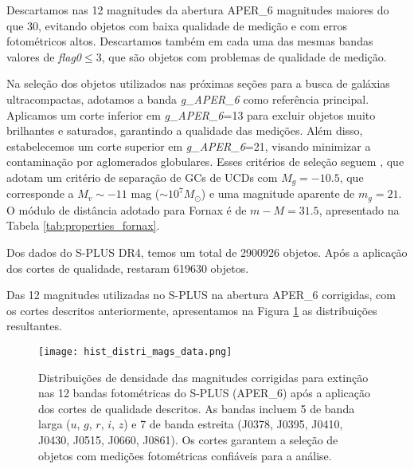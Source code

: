 Descartamos nas 12 magnitudes da abertura APER\_6 magnitudes maiores do que 30, evitando objetos com baixa qualidade de medição e com erros fotométricos altos. Descartamos também em cada uma das mesmas bandas valores de \textit{flag0}$\leq$3, que são objetos com problemas de qualidade de medição.

Na seleção dos objetos utilizados nas próximas seções para a busca de galáxias ultracompactas, adotamos a banda \textit{g\_APER\_6} como referência principal. Aplicamos um corte inferior em \textit{g\_APER\_6}=13 para excluir objetos muito brilhantes e saturados, garantindo a qualidade das medições. Além disso, estabelecemos um corte superior em \textit{g\_APER\_6}=21, visando minimizar a contaminação por aglomerados globulares. Esses critérios de seleção seguem \cite{Cantiello_2020}, que adotam um critério de separação de GCs de UCDs com $M_g=-10.5$, que corresponde a $M_v\sim -11$ mag ($\sim10^7 M_\odot$) e uma magnitude aparente de $m_g=21$. O módulo de distância adotado para Fornax é de $m-M=31.5$, apresentado na Tabela \ref{tab:properties_fornax}.

Dos dados do S-PLUS DR4, temos um total de 2900926 objetos. Após a aplicação dos cortes de qualidade, restaram 619630 objetos.

Das 12 magnitudes utilizadas no S-PLUS na abertura APER\_6 corrigidas, com os cortes descritos anteriormente, apresentamos na Figura \ref{fig:hist_distri_mags_data} as distribuições resultantes.

\begin{figure}[!ht]
    \begin{center}
    \texttt{[image: hist\_distri\_mags\_data.png]}
    \caption[]{Distribuições de densidade das magnitudes corrigidas para extinção nas 12 bandas fotométricas do S-PLUS (APER\_6) após a aplicação dos cortes de qualidade descritos. As bandas incluem 5 de banda larga ($u$, $g$, $r$, $i$, $z$) e 7 de banda estreita (J0378, J0395, J0410, J0430, J0515, J0660, J0861). Os cortes garantem a seleção de objetos com medições fotométricas confiáveis para a análise.}
    \label{fig:hist_distri_mags_data}
    \end{center}
\end{figure}
